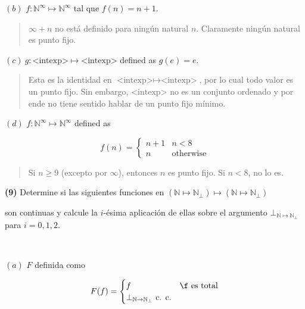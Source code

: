 \documentclass[a4paper, 12pt]{article}
\begin{document}
$(b)$ $f : \mathbb{N}^\infty\mapsto \mathbb{N}^\infty$ tal que $f(n) = n + 1$.



\small
\begin{quote}

$\infty + n$ no está definido para ningún natural $n$. Claramente ningún natural
es punto fijo.

\end{quote}
\normalsize

$(c) ~ g : \text{<intexp>} \mapsto \text{<intexp>}$  defined as $g(e) = e$.


\small
\begin{quote}

Esta es la identidad en $\text{<intexp>} \mapsto \text{<intexp>}$,
por lo cual todo valor es un punto fijo. Sin embargo, $\text{<intexp>}$ no es un
conjunto ordenado y por ende no tiene sentido hablar de un punto
fijo mínimo.

\end{quote}
\normalsize

$(d)$ $f : \mathbb{N}^\infty \mapsto \mathbb{N}^\infty$ defined as 

\begin{equation*}
  f(n) = \begin{cases}
    n + 1 & n < 8 \\ 
    n & \text{otherwise}
  \end{cases}
\end{equation*}


\small
\begin{quote}

Si $n \geq 9$ (excepto por $\infty$), entonces $n$ es punto fijo. Si $n < 8$, no lo es.

\end{quote}
\normalsize

\pagebreak 

\begin{myframe}
\textbf{(9)} Determine si las siguientes funciones en 
$( \mathbb{N} \mapsto\mathbb{N}_{\bot }) \mapsto ( \mathbb{N} \mapsto\mathbb{N}_{\bot })$

son continuas y calcule la
$i$-ésima aplicación de ellas sobre el argumento 
$\bot_{\mathbb{N} \mapsto \mathbb{N}_{\bot }}$ para $i = 0, 1, 2$.
\end{myframe}
~

$(a)$ $F$ definida como 

\begin{equation*}
  F(f) = \begin{cases}
    f & \f \text{ es total} \\ 
    \bot_{\mathbb{N}\to \mathbb{N}_\bot } \text{ c. c.}
  \end{cases}
\end{equation*}
\end{document}
